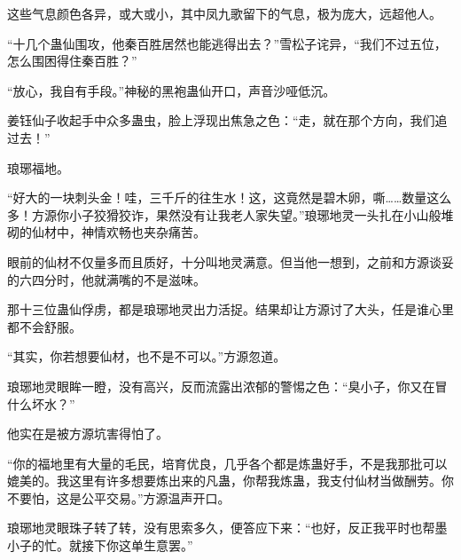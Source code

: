 \begin{this_body}
这些气息颜色各异，或大或小，其中凤九歌留下的气息，极为庞大，远超他人。

“十几个蛊仙围攻，他秦百胜居然也能逃得出去？”雪松子诧异，“我们不过五位，怎么围困得住秦百胜？”

“放心，我自有手段。”神秘的黑袍蛊仙开口，声音沙哑低沉。

姜钰仙子收起手中众多蛊虫，脸上浮现出焦急之色：“走，就在那个方向，我们追过去！”

琅琊福地。

“好大的一块刺头金！哇，三千斤的往生水！这，这竟然是碧木卵，嘶……数量这么多！方源你小子狡猾狡诈，果然没有让我老人家失望。”琅琊地灵一头扎在小山般堆砌的仙材中，神情欢畅也夹杂痛苦。

眼前的仙材不仅量多而且质好，十分叫地灵满意。但当他一想到，之前和方源谈妥的六四分时，他就满嘴的不是滋味。

那十三位蛊仙俘虏，都是琅琊地灵出力活捉。结果却让方源讨了大头，任是谁心里都不会舒服。

“其实，你若想要仙材，也不是不可以。”方源忽道。

琅琊地灵眼眸一瞪，没有高兴，反而流露出浓郁的警惕之色：“臭小子，你又在冒什么坏水？”

他实在是被方源坑害得怕了。

“你的福地里有大量的毛民，培育优良，几乎各个都是炼蛊好手，不是我那批可以媲美的。我这里有许多想要炼出来的凡蛊，你帮我炼蛊，我支付仙材当做酬劳。你不要怕，这是公平交易。”方源温声开口。

琅琊地灵眼珠子转了转，没有思索多久，便答应下来：“也好，反正我平时也帮墨小子的忙。就接下你这单生意罢。”

\end{this_body}

